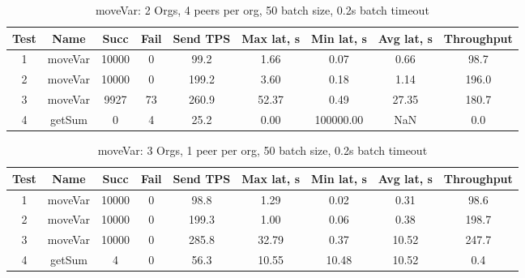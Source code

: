 \begin{appendices}
\begin{table}[H]
\begin{center}
\begin{tabular}{ |c|c|c|c|c|c|c|c|c| }
 \hline
  Test & Name & Succ  & Fail & Send TPS & Max lat, s & Min lat, s & Avg lat, s & Throughput \\
 \hline
 \hline
 1    & moveVar & 10000 & 0    & 99.2  & 1.66      & 0.07      & 0.66      & 98.7  \\
 \hline
 2    & moveVar & 10000 & 0    & 199.2 & 3.60      & 0.18      & 1.14      & 196.0 \\
 \hline
 3    & moveVar & 9927  & 73   & 260.9 & 52.37     & 0.49      & 27.35     & 180.7 \\
 \hline
 4    & getSum  & 0     & 4    & 25.2  & 0.00      & 100000.00 & NaN       & 0.0   \\
 \hline
\end{tabular}
\end{center}
\caption{moveVar: 2 Orgs, 4 peers per org, 50 batch size, 0.2s batch timeout}
\end{table}

\begin{table}[H]
\begin{center}
\begin{tabular}{ |c|c|c|c|c|c|c|c|c| }
 \hline
  Test & Name & Succ  & Fail & Send TPS & Max lat, s & Min lat, s & Avg lat, s & Throughput \\
 \hline
 \hline
 1    & moveVar & 10000 & 0    & 98.8  & 1.29      & 0.02      & 0.31      & 98.6  \\
 \hline
 2    & moveVar & 10000 & 0    & 199.3 & 1.00      & 0.06      & 0.38      & 198.7 \\
 \hline
 3    & moveVar & 10000 & 0    & 285.8 & 32.79     & 0.37      & 10.52     & 247.7 \\
 \hline
 4    & getSum  & 4     & 0    & 56.3  & 10.55     & 10.48     & 10.52     & 0.4   \\
 \hline
\end{tabular}
\end{center}
\caption{moveVar: 3 Orgs, 1 peer per org, 50 batch size, 0.2s batch timeout}
\end{table}


\end{appendices}
